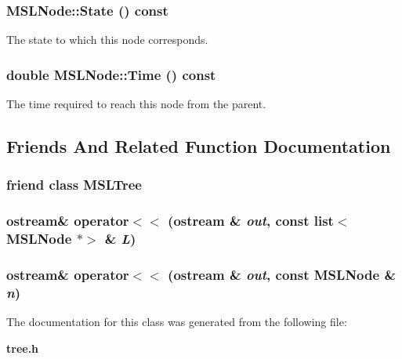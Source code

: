 \subsubsection{ MSLNode::State () const\hspace{0.3cm}{\tt  [inline]}}\label{class_MSLNode_a0}


The state to which this node corresponds.

\subsubsection{\setlength{\rightskip}{0pt plus 5cm}double MSLNode::Time () const\hspace{0.3cm}{\tt  [inline]}}\label{class_MSLNode_a4}


The time required to reach this node from the parent.



\subsection{Friends And Related Function Documentation}
\subsubsection{\setlength{\rightskip}{0pt plus 5cm}friend class MSLTree\hspace{0.3cm}{\tt  [friend]}}\label{class_MSLNode_l0}


\subsubsection{\setlength{\rightskip}{0pt plus 5cm}ostream\& operator$<$$<$ (ostream \& {\em out}, const list$<$ MSLNode $\ast$$>$ \& {\em L})\hspace{0.3cm}{\tt  [friend]}}\label{class_MSLNode_l2}


\subsubsection{\setlength{\rightskip}{0pt plus 5cm}ostream\& operator$<$$<$ (ostream \& {\em out}, const MSLNode \& {\em n})\hspace{0.3cm}{\tt  [friend]}}\label{class_MSLNode_l1}




The documentation for this class was generated from the following file:\begin{CompactItemize}
\item 
{\bf tree.h}\end{CompactItemize}
